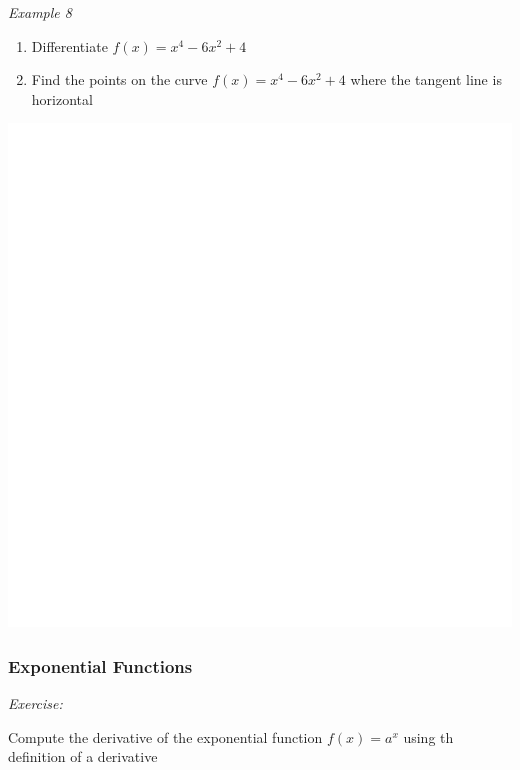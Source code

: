 \documentclass[]{book}
\begin{document}
\newpage

\emph{Example 8}

\begin{enumerate}
\def\labelenumi{\alph{enumi})}
\item
  Differentiate \(f(x)=x^4 - 6x^2+4\)
\item
  Find the points on the curve \(f(x)=x^4-6x^2+4\) where the tangent line is horizontal
\end{enumerate}

\begin{center}\includegraphics[width=1\linewidth]{figure/LB13-1} \end{center}

\newpage

\hypertarget{exponential-functions}{%
\subsubsection{Exponential Functions}\label{exponential-functions}}

\emph{Exercise:}

Compute the derivative of the exponential function \(f(x) = a^x\) using th definition of a derivative
\end{document}
